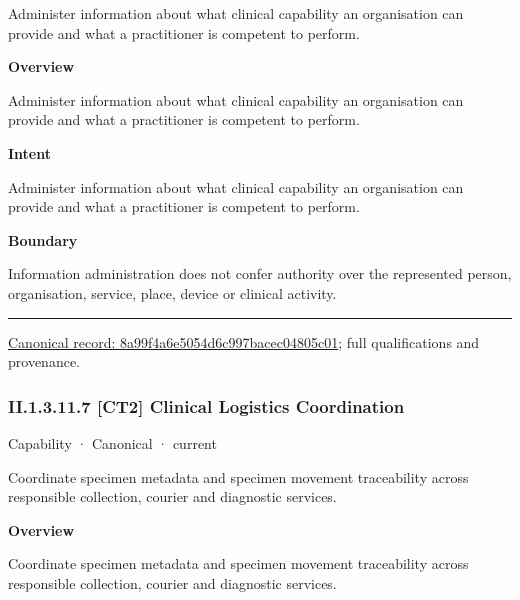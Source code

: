 Administer information about what clinical capability an organisation can provide and what a practitioner is competent to perform.



\textbf{Overview}



Administer information about what clinical capability an organisation can provide and what a practitioner is competent to perform.



\textbf{Intent}



Administer information about what clinical capability an organisation can provide and what a practitioner is competent to perform.



\textbf{Boundary}



Information administration does not confer authority over the represented person, organisation, service, place, device or clinical activity.



\medskip\hrule\medskip

{\footnotesize \href{../../../../continuum/strategy/capability/8a99f4a6e5054d6c997bacec04805c01.md}{Canonical record: 8a99f4a6e5054d6c997bacec04805c01}; full qualifications and provenance.}\par
\subsubsection*{II.1.3.11.7 [CT2] Clinical Logistics Coordination}
\label{navigation:II.1.3.11.7}

\label{element:0c27be11b4a44cb19e992309b8146a17}
{\small Capability · Canonical · current}\par

Coordinate specimen metadata and specimen movement traceability across responsible collection, courier and diagnostic services.



\textbf{Overview}



Coordinate specimen metadata and specimen movement traceability across responsible collection, courier and diagnostic services.



